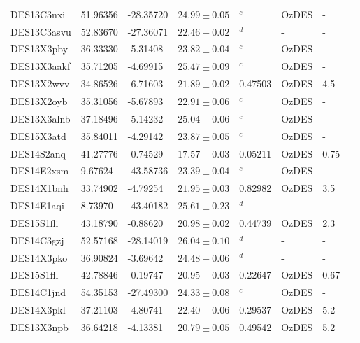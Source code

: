\documentclass[fleqn,usenatbib,]{mnras}
\begin{document}
\begin{table}
\begin{threeparttable}
\begin{tabular}{llllllll}
DES13C3nxi     & 51.96356 & -28.35720 & $24.99 \pm 0.05$ &    $^c$ &      OzDES &             - \\
DES13C3asvu    & 52.83670 & -27.36071 & $22.46 \pm 0.02$ &    $^d$ &          - &             - \\
DES13X3pby     & 36.33330 &  -5.31408 & $23.82 \pm 0.04$ &    $^c$ &      OzDES &             - \\
DES13X3aakf    & 35.71205 &  -4.69915 & $25.47 \pm 0.09$ &    $^c$ &      OzDES &             - \\
DES13X2wvv     & 34.86526 &  -6.71603 & $21.89 \pm 0.02$ & 0.47503 &      OzDES &       4.5 \\
DES13X2oyb     & 35.31056 &  -5.67893 & $22.91 \pm 0.06$ &    $^c$ &      OzDES &             - \\
DES13X3alnb    & 37.18496 &  -5.14232 & $25.04 \pm 0.06$ &    $^c$ &      OzDES &             - \\
DES15X3atd     & 35.84011 &  -4.29142 & $23.87 \pm 0.05$ &    $^c$ &      OzDES &             - \\
DES14S2anq     & 41.27776 &  -0.74529 & $17.57 \pm 0.03$ & 0.05211 &      OzDES &       0.75 \\
DES14E2xsm     &  9.67624 & -43.58736 & $23.39 \pm 0.04$ &    $^c$ &      OzDES &             - \\
DES14X1bnh     & 33.74902 &  -4.79254 & $21.95 \pm 0.03$ & 0.82982 &      OzDES &       3.5 \\
DES14E1aqi     &  8.73970 & -43.40182 & $25.61 \pm 0.23$ &    $^d$ &          - &             - \\
DES15S1fli     & 43.18790 &  -0.88620 & $20.98 \pm 0.02$ & 0.44739 &      OzDES &       2.3 \\
DES14C3gzj     & 52.57168 & -28.14019 & $26.04 \pm 0.10$ &    $^d$ &          - &             - \\
DES14X3pko     & 36.90824 &  -3.69642 & $24.48 \pm 0.06$ &    $^d$ &          - &             - \\
DES15S1fll     & 42.78846 &  -0.19747 & $20.95 \pm 0.03$ & 0.22647 &      OzDES &       0.67 \\
DES14C1jnd     & 54.35153 & -27.49300 & $24.33 \pm 0.08$ &    $^c$ &      OzDES &             - \\
DES14X3pkl     & 37.21103 &  -4.80741 & $22.40 \pm 0.06$ & 0.29537 &      OzDES &       5.2 \\
DES13X3npb     & 36.64218 &  -4.13381 & $20.79 \pm 0.05$ & 0.49542 &      OzDES &       5.2 \\

\end{tabular}
\end{threeparttable}
\end{table}
\end{document}
